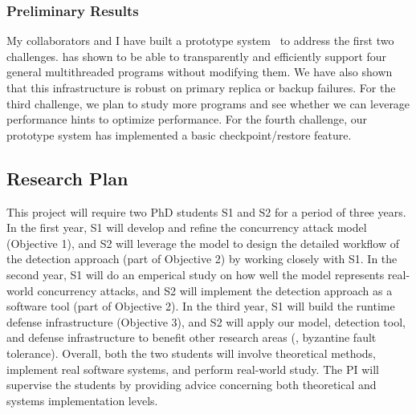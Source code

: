
\vspace{-.15in}\subsubsection{Preliminary Results} 
\label{sec:defense-result}\vspace{-.075in}

My collaborators and I have built a prototype system~\cite{crane:sosp15} to 
address the first two challenges. \crane has shown to be able to transparently 
and efficiently support four general multithreaded programs without modifying 
them. We have also shown that this infrastructure is robust on primary replica 
or backup failures. For the third challenge, we plan to study more 
programs and see whether we can leverage performance hints to optimize 
performance. For the fourth challenge, our prototype system \crane has 
implemented a basic checkpoint/restore feature.

\vspace{-.15in}\subsection{Research Plan} \label{sec:plan}\vspace{-.075in}

This \xxx project will require two PhD students S1 and S2 for a period of 
three years. In the first year, S1 will develop and refine the concurrency 
attack model (Objective 1), and S2 will leverage the model to design the 
detailed workflow of the detection approach (part of Objective 2) by working 
closely with S1. In the second year, S1 will do an emperical study on how well 
the model represents real-world concurrency attacks, and S2 will implement 
the detection approach as a software tool (part of Objective 2). In the third 
year, S1 will build the runtime defense infrastructure (Objective 3), and S2 
will apply our model, detection tool, and defense infrastructure to benefit 
other research areas (\eg, byzantine fault tolerance). Overall, both the two 
students will involve theoretical methods, implement real software systems, and 
perform real-world study. The PI will supervise the students by providing 
advice 
concerning both theoretical and systems implementation levels.


